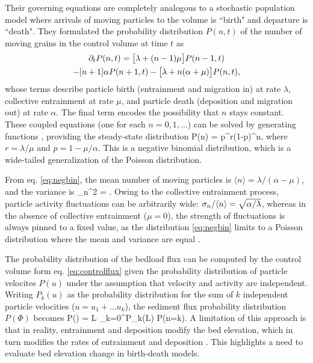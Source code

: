 Their governing equations are completely analogous to a stochastic population model \citep{Cox1965, Pielou1977} where arrivals of moving particles to the volume is ``birth" and departure is ``death".
They formulated the probability distribution $P(n,t)$ of the number of moving grains in the control volume at time $t$ as
\begin{multline} \partial_t P(n,t) = \big[\lambda + (n-1)\mu\big] P(n-1,t) \\ - [n+1]\alpha P(n+1,t) - \big[\lambda + n (\alpha + \mu)\big]P(n,t),\end{multline}
whose terms describe particle birth (entrainment and migration in) at rate $\lambda$, collective entrainment at rate $\mu$, and particle death (deposition and migration out) at rate $\alpha$.
The final term encodes the possibility that $n$ stays constant.
These coupled equations (one for each $n=0,1,\dots$) can be solved by generating functions \citep{Cox1965}, providing the steady-state distribution
\be P(n) = p^r(1-p)^n, \label{eq:negbin}\ee
where $r = \lambda/\mu$ and $p = 1-\mu/\alpha$.
This is a negative binomial distribution, which is a wide-tailed generalization of the Poisson distribution.

From eq. \ref{eq:negbin}, the mean number of moving particles is $\langle n \rangle = \lambda/(\alpha-\mu)$, and the variance is
\be \sigma_n^2 = . \ee
Owing to the collective entrainment process, particle activity fluctuations can be arbitrarily wide: $\sigma_n/\langle n \rangle = \sqrt{\alpha/\lambda}$, whereas in the absence of collective entrainment ($\mu=0$), the strength of fluctuations is always pinned to a fixed value, as the distribution \ref{eq:negbin} limits to a Poisson distribution where the mean and variance are equal \citep{Ancey2006}.

The probability distribution of the bedload flux can be computed by the control volume form eq. \ref{eq:controlflux} given the probability distribution of particle velocites $P(u)$ under the assumption that velocity and activity are independent.
Writing $P_k(u)$ as the probability distribution for the sum of $k$ independent particle velocities ($u=u_1+\dots u_k$), the sediment flux probability distribution $P(\Phi)$ becomes \citep[e.g.][]{Ancey2014}
\be P(\Phi) = L \sum_{k=0}^\infty P_k(L\Phi) P(n=k). \ee
A limitation of this approach is that in reality, entrainment and deposition modify the bed elevation, which in turn modifies the rates of entrainment and deposition \citep{Sawai1987,Wong2007}. 
This highlights a need to evaluate bed elevation change in birth-death models.

